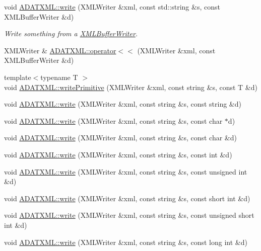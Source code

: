 \begin{DoxyCompactItemize}
\item 
void \mbox{\hyperlink{group__io_ga14c568a7a3ffb3e486c9036ff7382f8e}{A\+D\+A\+T\+X\+M\+L\+::write}} (X\+M\+L\+Writer \&xml, const std\+::string \&s, const X\+M\+L\+Buffer\+Writer \&d)
\begin{DoxyCompactList}\small\item\em Write something from a \mbox{\hyperlink{classADATXML_1_1XMLBufferWriter}{X\+M\+L\+Buffer\+Writer}}. \end{DoxyCompactList}\item 
X\+M\+L\+Writer \& \mbox{\hyperlink{group__io_ga5f6c03929b05296b731cf36fb65cf9c6}{A\+D\+A\+T\+X\+M\+L\+::operator$<$$<$}} (X\+M\+L\+Writer \&xml, const X\+M\+L\+Buffer\+Writer \&d)
\item 
{\footnotesize template$<$typename T $>$ }\\void \mbox{\hyperlink{namespaceADATXML_ac21baf6aebab16f5e0425a455d5868a6}{A\+D\+A\+T\+X\+M\+L\+::write\+Primitive}} (X\+M\+L\+Writer \&xml, const string \&s, const T \&d)
\item 
void \mbox{\hyperlink{namespaceADATXML_ad05599b1c54c5e920891cbcce093a4bc}{A\+D\+A\+T\+X\+M\+L\+::write}} (X\+M\+L\+Writer \&xml, const string \&s, const string \&d)
\item 
void \mbox{\hyperlink{namespaceADATXML_ad11e81d6d4aa85c354971b245aee9581}{A\+D\+A\+T\+X\+M\+L\+::write}} (X\+M\+L\+Writer \&xml, const string \&s, const char $\ast$d)
\item 
void \mbox{\hyperlink{namespaceADATXML_a366a5afc8f6a783dc42a12c7aa446c4a}{A\+D\+A\+T\+X\+M\+L\+::write}} (X\+M\+L\+Writer \&xml, const string \&s, const char \&d)
\item 
void \mbox{\hyperlink{namespaceADATXML_a9c82065f9ae0cd8f8cf613bebc0c60fc}{A\+D\+A\+T\+X\+M\+L\+::write}} (X\+M\+L\+Writer \&xml, const string \&s, const int \&d)
\item 
void \mbox{\hyperlink{namespaceADATXML_ae74cc956dd05ca6f00fc514974a9e910}{A\+D\+A\+T\+X\+M\+L\+::write}} (X\+M\+L\+Writer \&xml, const string \&s, const unsigned int \&d)
\item 
void \mbox{\hyperlink{namespaceADATXML_a4c9ae91c2edf209b107c441d5b61b737}{A\+D\+A\+T\+X\+M\+L\+::write}} (X\+M\+L\+Writer \&xml, const string \&s, const short int \&d)
\item 
void \mbox{\hyperlink{namespaceADATXML_aec4f1998ac8b46117a53c900880970b5}{A\+D\+A\+T\+X\+M\+L\+::write}} (X\+M\+L\+Writer \&xml, const string \&s, const unsigned short int \&d)
\item 
void \mbox{\hyperlink{namespaceADATXML_ad3215354aef6061e9896556e834f89bd}{A\+D\+A\+T\+X\+M\+L\+::write}} (X\+M\+L\+Writer \&xml, const string \&s, const long int \&d)

\end{DoxyCompactItemize}
